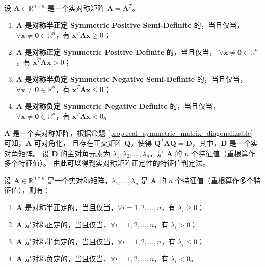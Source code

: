 \vspace{1em}

\begin{definition}
    设 $\mathbf{A}\in \mathbb{R}^{n\times n}$ 是一个实对称矩阵 $\mathbf{A}=\mathbf{A}^T$。
    \begin{enumerate}
        \item $\mathbf{A}$ 是\textbf{对称半正定 Symmetric Positive Semi-Definite} 的，当且仅当，
        $\forall \mathbf{x} \neq \mathbf{0} \in \mathbb{R}^n$，有 $\mathbf{x}^T\mathbf{A}\mathbf{x} \geq 0$；
        \item $\mathbf{A}$ 是\textbf{对称正定 Symmetric Positive Definite} 的，当且仅当，
        $\forall \mathbf{x} \neq \mathbf{0} \in \mathbb{R}^n$，有 $\mathbf{x}^T\mathbf{A}\mathbf{x} > 0$；
        \item $\mathbf{A}$ 是\textbf{对称半负定 Symmetric Negative Semi-Definite} 的，当且仅当，
        $\forall \mathbf{x} \neq \mathbf{0} \in \mathbb{R}^n$，有 $\mathbf{x}^T\mathbf{A}\mathbf{x} \leq 0$；
        \item $\mathbf{A}$ 是\textbf{对称负定 Symmetric Negative Definite} 的，当且仅当，
        $\forall \mathbf{x} \neq \mathbf{0} \in \mathbb{R}^n$，有 $\mathbf{x}^T\mathbf{A}\mathbf{x} < 0$。
    \end{enumerate}
    \label{def:symmetric_positive_definite_matrix}
\end{definition}

\begin{note}
    $\mathbf{A}$ 是一个实对称矩阵，根据命题 \ref{prop:real_symmetric_matrix_diagonalizable} 可知，$\mathbf{A}$ 可对角化，
    且存在正交矩阵 $\mathbf{Q}$，使得 $\mathbf{Q}^T \mathbf{A} \mathbf{Q} = \mathbf{D}$，其中，$\mathbf{D}$ 是一个实对角矩阵。
    设 $\mathbf{D}$ 的主对角元素为 $\lambda_1,\lambda_2,\ldots,\lambda_n$，是 $\mathbf{A}$ 的 $n$ 个特征值（重根算作多个特征值）。
    由此可以得到实对称矩阵正定性的特征值判定法。
\end{note}
\vspace{1em}

\begin{proposition}[实对称矩阵的正定性的特征值判定法]
    设 $\mathbf{A}\in \mathbb{R}^{n\times n}$ 是一个实对称矩阵，$\lambda_1,\ldots,\lambda_n$ 是 $\mathbf{A}$ 的 $n$ 个特征值（重根算作多个特征值），则有：
    \begin{enumerate}
        \item $\mathbf{A}$ 是对称半正定的，当且仅当，$\forall i=1,2,\ldots,n$，有 $\lambda_i \geq 0$；
        \item $\mathbf{A}$ 是对称正定的，当且仅当，$\forall i=1,2,\ldots,n$，有 $\lambda_i > 0$；
        \item $\mathbf{A}$ 是对称半负定的，当且仅当，$\forall i=1,2,\ldots,n$，有 $\lambda_i \leq 0$；
        \item $\mathbf{A}$ 是对称负定的，当且仅当，$\forall i=1,2,\ldots,n$，有 $\lambda_i < 0$。
    \end{enumerate}
    \label{prop:real_symmetric_matrix_positive_definite}
\end{proposition}

